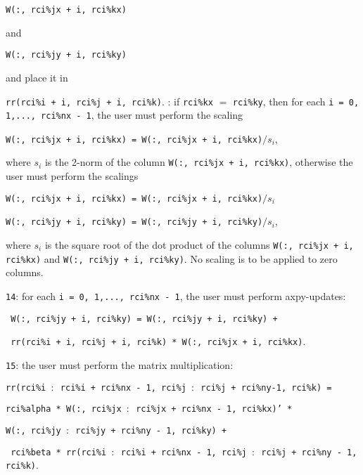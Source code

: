 \begin{description}
\begin{description}
\hspace{8mm}
{\tt W(:, rci\%jx + i, rci\%kx)} 

and

\hspace{8mm}
{\tt W(:, rci\%jy + i, rci\%ky)}

and place it in 

\hspace{8mm}
{\tt rr(rci\%i + i, rci\%j + i, rci\%k)}.
%
: 
if {\tt rci\%kx} $=$ {\tt rci\%ky}, then
for each
{\tt i = 0, 1,..., rci\%nx - 1}, 
the user must perform the scaling

\hspace{8mm}
{\tt W(:, rci\%jx + i, rci\%kx) = W(:, rci\%jx + i, rci\%kx)$/s_i$},

where $s_i$ is the 2-norm of the column 
{\tt W(:, rci\%jx + i, rci\%kx)},
otherwise the user must perform the scalings

\hspace{8mm}
{\tt W(:, rci\%jx + i, rci\%kx) = W(:, rci\%jx + i, rci\%kx)$/s_i$}

\hspace{8mm}
{\tt W(:, rci\%jy + i, rci\%ky) = W(:, rci\%jy + i, rci\%ky)$/s_i$},

where $s_i$ is the square root of the dot product of 
the columns 
{\tt W(:, rci\%jx + i, rci\%kx)} and
{\tt W(:, rci\%jy + i, rci\%ky)}.
No scaling is to be applied to zero columns.
%
\item
{\tt 14}: 
for each {\tt i = 0, 1,..., rci\%nx - 1}, 
the user must perform axpy-updates:

\hspace{8mm}
{\tt 
W(:, rci\%jy + i, rci\%ky) = 
W(:, rci\%jy + i, rci\%ky) + 
}

\hspace{12mm}
{\tt
rr(rci\%i + i, rci\%j + i, rci\%k) * W(:, rci\%jx + i, rci\%kx)}.
%
\item
{\tt 15}: the user must perform the matrix multiplication:

\hspace{8mm}
{\tt rr(rci\%i $:$ rci\%i + rci\%nx - 1, rci\%j $:$ 
rci\%j + rci\%ny-1, rci\%k) =}

\hspace{12mm}
{\tt rci\%alpha *
W(:, rci\%jx $:$ rci\%jx + rci\%nx - 1, rci\%kx)' *}

\hspace{16mm}
{\tt W(:, rci\%jy $:$ rci\%jy + rci\%ny - 1, rci\%ky) +}

\hspace{12mm}
{\tt 
rci\%beta *
rr(rci\%i $:$ rci\%i + rci\%nx - 1, rci\%j $:$ rci\%j + rci\%ny - 1, rci\%k)}.


\end{description}
\end{description}
